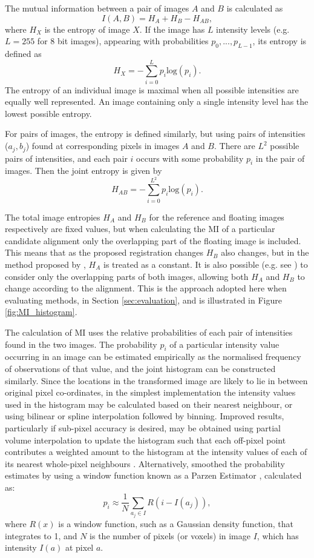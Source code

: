 \documentclass{report}
\begin{document}
The mutual information between a pair of images $A$ and $B$ is calculated as
\begin{equation}
I(A,B) = H_A + H_B - H_{AB},
\label{eq:MI}
\end{equation}
where $H_X$ is the entropy of image $X$. If the image has $L$ intensity levels (e.g. $L=255$ for 8 bit images), appearing with probabilities $p_0, ..., p_{L-1}$, its entropy is defined as
\[
H_X = - \sum_{i = 0}^L p_i \text{log}({p_i}).
\]
The entropy of an individual image is maximal when all possible intensities are equally well represented. An image containing only a single intensity level has the lowest possible entropy.

For pairs of images, the entropy is defined similarly, but using pairs of intensities ($a_j, b_j$) found at corresponding pixels in images $A$ and $B$. There are $L^2$ possible pairs of intensities, and each pair $i$ occurs with some probability $p_i$ in the pair of images. Then the joint entropy is given by
\[
H_{AB} = - \sum_{i = 0}^{L^2} p_i \text{log}({p_i}).
\]

The total image entropies $H_A$ and $H_B$ for the reference and floating images respectively are fixed values, but when calculating the MI of a particular candidate alignment only the overlapping part of the floating image is included. This means that as the proposed registration changes $H_B$ also changes, but in the method proposed by \cite{wells1996multi}, $H_A$ is treated as a constant. It is also possible (e.g. see \cite{maes1997multimodality}) to consider only the overlapping parts of both images, allowing both $H_A$ and $H_B$ to change according to the alignment. This is the approach adopted here when evaluating methods, in Section \ref{sec:evaluation}, and is illustrated in Figure \ref{fig:MI_histogram}.

The calculation of MI uses the relative probabilities of each pair of intensities found in the two images. The probability $p_i$ of a particular intensity value occurring in an image can be estimated empirically as the normalised frequency of observations of that value, and the joint histogram can be constructed similarly. Since the locations in the transformed image are likely to lie in between original pixel co-ordinates, in the simplest implementation the intensity values used in the histogram may be calculated based on their nearest neighbour, or using bilinear or spline interpolation followed by binning. Improved results, particularly if sub-pixel accuracy is desired, may be obtained using partial volume interpolation to update the histogram such that each off-pixel point contributes a weighted amount to the histogram at the intensity values of each of its nearest whole-pixel neighbours \citep{maes1997multimodality}. Alternatively, \cite{viola1997alignment} smoothed the probability estimates by using a window function known as a Parzen Estimator \citep{parzen1962estimation}, calculated as:
\[
p_i \approx \frac{1}{N} \sum_{a_j \in I} R(i - I(a_j)),
\]
where $R(x)$ is a window function, such as a Gaussian density function, that integrates to 1, and $N$ is the number of pixels (or voxels) in image $I$, which has intensity $I(a)$ at pixel $a$.
\end{document}
